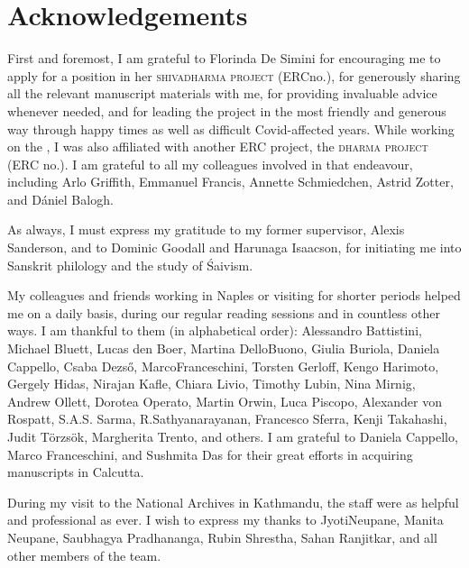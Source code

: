 \thispagestyle{empty}
\chapter*{Acknowledgements}
\label{acknowledgements}
\vspace{-1em}

\noindent
First and foremost, I am grateful to Florinda De Simini for
encouraging me to apply for a position in her 
\textsc{\hbox{shivadharma} project} (ERC\linebreak no.),
for generously sharing all the relevant manuscript materials with me, 
for providing invaluable advice whenever needed, and for 
leading the project in the most friendly and
generous way through happy times as well as 
difficult Covid-affected years. 
While working on the \Vss, I was also affiliated with 
another ERC project, the \textsc{dharma project} (ERC no.).
I am grateful to all my colleagues involved in that endeavour,
including Arlo Griffith, Emmanuel Francis, Annette Schmiedchen, 
Astrid Zotter, and Dániel Balogh.

As always, I must express my gratitude to my former supervisor,
Alexis Sanderson, and to Dominic Goodall and 
Harunaga Isaacson, for initiating me into Sanskrit philology and
the study of Śaivism.

My colleagues and friends working in Naples or visiting for
shorter periods helped me on a daily basis, during our regular reading sessions and in countless
other ways. I am thankful to them (in alphabetical order):
Alessandro Battistini, 
Michael Bluett, 
Lucas den Boer, 
Martina Dello\linebreak Buono, 
Giulia Buriola, 
Daniela Cappello,
Csaba Dezső, 
Marco\linebreak \mbox{Franceschini}, 
Torsten Gerloff, 
Kengo Harimoto, 
Gergely Hidas,
Nirajan Kafle, 
Chiara Livio, 
Timothy Lubin, 
Nina Mirnig, 
Andrew Ollett,\linebreak 
Dorotea Operato, 
Martin Orwin, 
Luca Piscopo, 
Alexander von Rospatt, 
S.\thinspace A.\thinspace S. Sarma,
R.\thinspace Sathyanarayanan, 
Francesco Sferra, 
Kenji Takahashi,\linebreak 
Judit Törzsök,
Margherita Trento, 
and others.
I am grateful to Daniela Cappello, Marco Franceschini, 
and Sushmita Das for their great efforts in acquiring manu\-scripts in Calcutta.

During my visit to the National Archives in
Kathmandu, the staff were as helpful and professional as ever.
I wish to express my thanks to Jyoti\linebreak Neupane, Manita Neupane, Saubhagya Pradhananga, Rubin Shrestha,\linebreak
Sahan Ranjitkar, and all %
other members of the team.

